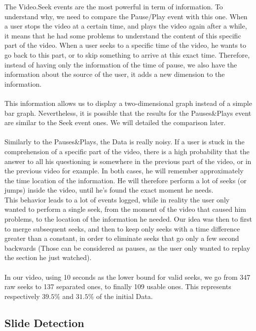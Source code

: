 \documentclass[11pt,a4paper]{article}
\begin{document}
The Video.Seek events are the most powerful in term of information. To understand why, we need to compare the Pause/Play event with this one. When a user stops the video at a certain time, and plays the video again after a while, it means that he had some problems to understand the content of this specific part of the video. When a user seeks to a specific time of the video, he wants to go back to this part, or to skip something to arrive at this exact time. Therefore, instead of having only the information of the time of pause, we also have the information about the source of the user, it adds a new dimension to the information. \\
\\
This information allows us to display a two-dimensional graph instead of a simple bar graph. Nevertheless, it is possible that the results for the Pauses\&Plays event are similar to the Seek event ones. We will detailed the comparison later. \\
\\
Similarly to the Pauses\&Plays, the Data is really noisy. If a user is stuck in the comprehension of a specific part of the video, there is a high probability that the answer to all his questioning is somewhere in the previous part of the video, or in the previous video for example. In both cases, he will remember approximately the time location of the information. He will therefore perform a lot of seeks (or jumps) inside the video, until he's found the exact moment he needs. \\
This behavior leads to a lot of events logged, while in reality the user only wanted to perform a single seek, from the moment of the video that caused him problems, to the location of the information he needed. Our idea was then to first to merge subsequent seeks, and then to keep only seeks with a time difference greater than a constant, in order to eliminate seeks that go only a few second backwards (Those can be considered as pauses, as the user only wanted to replay the section he just watched).\\
\\
In our video, using 10 seconds as the lower bound for valid seeks, we go from 347 raw seeks to 137 separated ones, to finally 109 usable ones. This represents respectively $39.5\%$ and $31.5\%$ of the initial Data. 

\subsection{Slide Detection}
\end{document}
